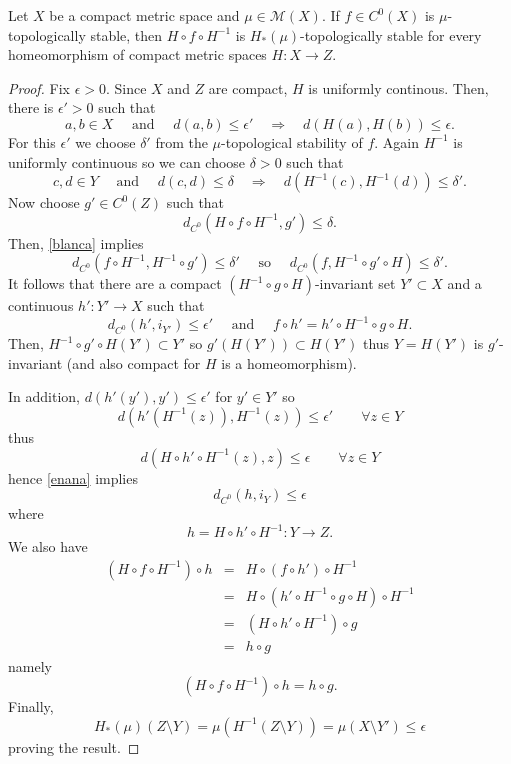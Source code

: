 \documentclass[10pt,a4paper]{amsart}
\begin{document}
\begin{lemma}
\label{invariance}
Let $X$ be a compact metric space and $\mu\in \mathcal{M}(X)$.
If $f\in C^0(X)$ is $\mu$-topologically stable, then $H\circ f\circ H^{-1}$ is $H_*(\mu)$-topologically stable for every homeomorphism of compact metric spaces $H:X\to Z$.
\end{lemma}

\begin{proof}
Fix $\epsilon>0$. Since $X$ and $Z$ are compact, $H$ is uniformly continous. Then, there is $\epsilon'>0$ such that
\begin{equation}
\label{enana}
a,b\in X\quad\mbox{ and }\quad d(a,b)\leq \epsilon'\quad\Longrightarrow\quad d(H(a),H(b))\leq\epsilon.
\end{equation}
For this $\epsilon'$ we choose $\delta'$ from the $\mu$-topological stability of $f$.
Again $H^{-1}$ is uniformly continuous so we can choose $\delta>0$ such that
\begin{equation}
\label{blanca}
c,d\in Y\quad\mbox{ and }\quad d(c,d)\leq \delta\quad\Longrightarrow\quad d(H^{-1}(c),H^{-1}(d))\leq\delta'.
\end{equation}
Now choose $g'\in C^0(Z)$ such that
$$
d_{C^0}(H\circ f\circ H^{-1},g')\leq\delta.
$$
Then, \eqref{blanca} implies
$$
d_{C^0}(f\circ H^{-1},H^{-1}\circ g')\leq\delta'\quad \mbox{ so }\quad d_{C^0}(f,H^{-1}\circ g'\circ H)\leq \delta'.
$$
It follows that there are a compact $(H^{-1}\circ g\circ H)$-invariant set $Y'\subset X$ and a continuous $h':Y'\to X$ such that
$$
d_{C^0}(h',i_{Y'})\leq \epsilon'\quad\mbox{ and }\quad f\circ h'=h'\circ H^{-1}\circ g\circ H.
$$
Then,
$H^{-1}\circ g'\circ H(Y')\subset Y'$ so $g'(H(Y'))\subset H(Y')$
thus $Y=H(Y')$ is $g'$-invariant
(and also compact for $H$ is a homeomorphism).

In addition,
$d(h'(y'),y')\leq \epsilon'$ for $y'\in Y'$ so
$$
d(h'(H^{-1}(z)),H^{-1}(z))\leq\epsilon'\quad\quad\forall z\in Y
$$
thus 
$$
d(H\circ h'\circ H^{-1}(z),z)\leq\epsilon\quad\quad\forall z\in Y
$$
hence \eqref{enana} implies
$$
d_{C^0}(h,i_Y)\leq \epsilon
$$
where
$$
h=H\circ h'\circ H^{-1}:Y\to Z.
$$
We also have
\begin{eqnarray*}
(H\circ f\circ H^{-1})\circ h & = & H\circ (f\circ h')\circ H^{-1}\\
& = & H\circ (h'\circ H^{-1}\circ g\circ H)\circ H^{-1}\\
& = & (H\circ h'\circ H^{-1})\circ g\\
& = & h\circ g
\end{eqnarray*}
namely
$$
(H\circ f\circ H^{-1})\circ h=h\circ g.
$$
Finally,
$$
H_*(\mu)(Z\setminus Y)=\mu(H^{-1}(Z\setminus Y))=\mu(X\setminus Y')\leq \epsilon
$$
proving the result.
\end{proof}
\end{document}
